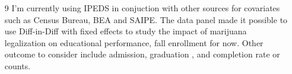 \documentclass[12pt]{article}
\theoremstyle{definition}
\begin{document}
\begin{enumerate}
\item[9]  
I'm currently using IPEDS in conjuction with other sources for covariates such as Census Bureau, BEA and SAIPE. The data panel made it possible to use Diff-in-Diff with fixed effects to study the impact of marijuana legalization on educational performance, fall enrollment for now. Other outcome to consider include admission, graduation , and completion rate or counts.
\end{enumerate}
 
\end{document}
